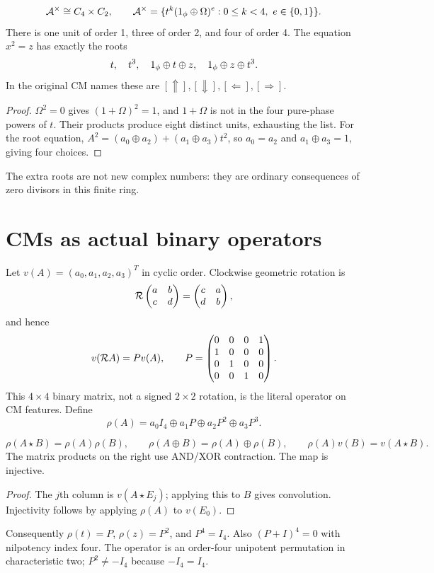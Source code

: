 \begin{proposition}
\begin{equation}
 \alg^\times\cong C_4\times C_2,
 \qquad\alg^\times=\{t^k(\one\oplus\Omega)^e:0\le k<4,\ e\in\{0,1\}\}.
\end{equation}
There is one unit of order 1, three of order 2, and four of order 4. The equation $x^2=z$ has exactly the roots
\begin{equation}
 t,\quad t^3,\quad 1_{\phi}\oplus t\oplus z,\quad 1_{\phi}\oplus z\oplus t^3.
\end{equation}
In the original CM names these are $[\Uparrow],[\Downarrow],[\Leftarrow],[\Rightarrow]$.
\end{proposition}
\begin{proof}
$\Omega^2=0$ gives $(1+\Omega)^2=1$, and $1+\Omega$ is not in the four pure-phase powers of $t$. Their products produce eight distinct units, exhausting the list. For the root equation, $A^2=(a_0\oplus a_2)+(a_1\oplus a_3)t^2$, so $a_0=a_2$ and $a_1\oplus a_3=1$, giving four choices.
\end{proof}
The extra roots are not new complex numbers: they are ordinary consequences of zero divisors in this finite ring.

\section{CMs as actual binary operators}\label{sec:operators}
Let $v(A)=(a_0,a_1,a_2,a_3)^T$ in cyclic order. Clockwise geometric rotation is
\begin{equation}
 \mathcal R\begin{pmatrix}a&b\\c&d\end{pmatrix}=\begin{pmatrix}c&a\\d&b\end{pmatrix},
\end{equation}
and hence
\begin{equation}\label{eq:P}
 v(\mathcal R A)=Pv(A),\qquad
 P=\begin{pmatrix}0&0&0&1\\1&0&0&0\\0&1&0&0\\0&0&1&0\end{pmatrix}.
\end{equation}
This $4\times4$ binary matrix, not a signed $2\times2$ rotation, is the literal operator on CM features. Define
\begin{equation}\label{eq:regular}
 \rho(A)=a_0I_4\oplus a_1P\oplus a_2P^2\oplus a_3P^3.
\end{equation}
\begin{proposition}
\begin{equation}
 \rho(A\star B)=\rho(A)\rho(B),\qquad
 \rho(A\oplus B)=\rho(A)\oplus\rho(B),\qquad
 \rho(A)v(B)=v(A\star B).
\end{equation}
The matrix products on the right use AND/XOR contraction. The map is injective.
\end{proposition}
\begin{proof}
The $j$th column is $v(A\star E_j)$; applying this to $B$ gives convolution. Injectivity follows by applying $\rho(A)$ to $v(E_0)$.
\end{proof}
Consequently $\rho(t)=P$, $\rho(z)=P^2$, and $P^4=I_4$. Also $(P+I)^4=0$ with nilpotency index four. The operator is an order-four unipotent permutation in characteristic two; $P^2\ne-I_4$ because $-I_4=I_4$.

